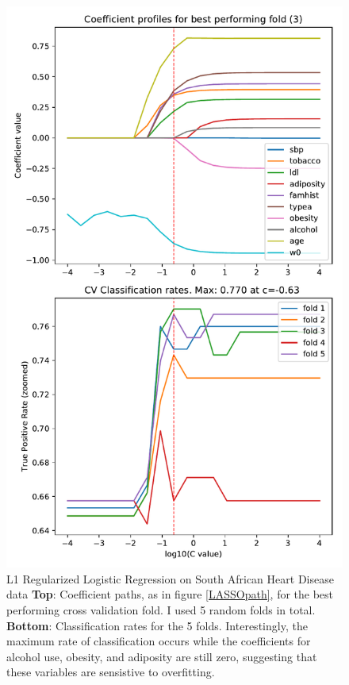 \documentclass[%
 reprint,
 amsmath,amssymb,
 aps,
]{revtex4-1}
\begin{document}
 \begin{figure}
   \includegraphics[width=\linewidth]{../figs/LogRegCV}
   \caption{L1 Regularized Logistic Regression on South African Heart Disease data
   \textbf{Top}: Coefficient paths, as in figure \ref{LASSOpath}, for the best performing cross validation fold.
   I used 5 random folds in total.
   \textbf{Bottom}: Classification rates for the 5 folds. Interestingly, the maximum rate of classification occurs while the coefficients for alcohol use, obesity, and adiposity are still zero, suggesting that these variables are sensistive to overfitting.
   }
   \label{SAHeart}
 \end{figure}
\end{document}
